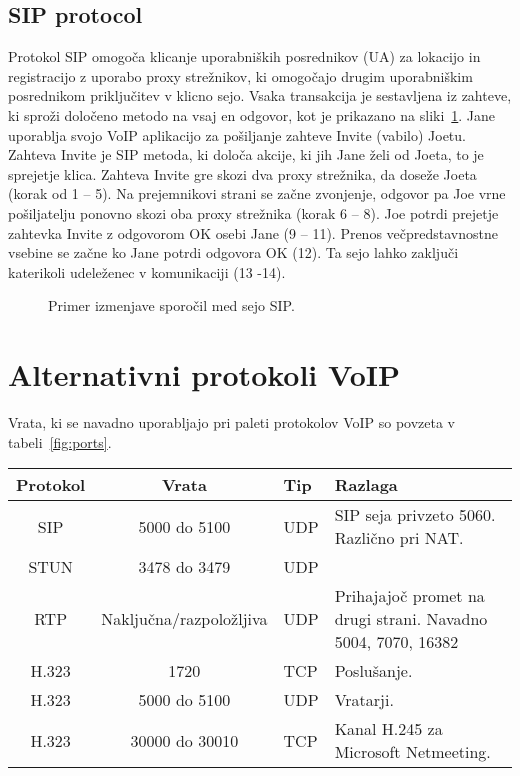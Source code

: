 \documentclass{acm_proc_article-sp}
\begin{document}
\subsection{SIP protocol}

Protokol SIP omogoča klicanje uporabniških posrednikov (UA) za lokacijo in registracijo z uporabo proxy strežnikov, ki omogočajo drugim uporabniškim posrednikom priključitev v klicno sejo. Vsaka transakcija je sestavljena iz zahteve, ki sproži določeno metodo na vsaj en odgovor, kot je prikazano na sliki~\ref{fig:sip}. Jane uporablja svojo VoIP aplikacijo za pošiljanje zahteve Invite (vabilo) Joetu. Zahteva Invite je SIP metoda, ki določa akcije, ki jih Jane želi od Joeta, to je sprejetje klica. Zahteva Invite gre skozi dva proxy strežnika, da doseže Joeta (korak od 1 – 5). Na prejemnikovi strani se začne zvonjenje, odgovor pa Joe vrne pošiljatelju ponovno skozi oba proxy strežnika (korak 6 – 8). Joe potrdi prejetje zahtevka Invite z odgovorom OK osebi Jane (9 – 11). Prenos večpredstavnostne vsebine se začne ko Jane potrdi odgovora OK (12). Ta sejo lahko zaključi katerikoli udeleženec v komunikaciji (13 -14).

\begin{figure}
\centering
{} %
\caption{Primer izmenjave sporočil med sejo SIP.}
\label{fig:sip}
\end{figure}

\section{Alternativni protokoli VoIP}
Vrata, ki se navadno uporabljajo pri paleti protokolov VoIP so povzeta v tabeli~\ref{fig:ports}.

\begin{table*}
\centering
\caption{Uporaba vrat pri protokolu VoIP}
\label{fig:ports}
\begin{tabular}{|c|c|l|l|} \hline
  Protokol&Vrata&Tip&Razlaga\\ \hline
  SIP & 5000 do 5100& UDP & SIP seja privzeto 5060. Različno pri NAT.\\ \hline
  STUN & 3478 do 3479& UDP & \\ \hline
  RTP & Naključna/razpoložljiva & UDP & Prihajajoč promet na drugi strani. Navadno 5004, 7070, 16382\\ \hline
  H.323 & 1720 & TCP & Poslušanje.\\ \hline
  H.323 & 5000 do 5100 & UDP & Vratarji.\\ \hline
  H.323 & 30000 do 30010 & TCP & Kanal H.245 za Microsoft Netmeeting.\\
\hline\end{tabular}
\end{table*}
\end{document}
